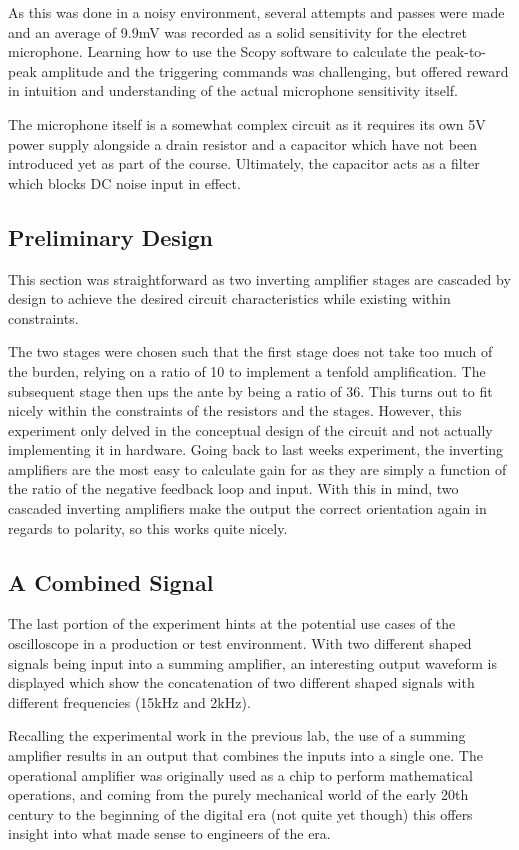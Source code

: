 \documentclass[12pt]{article}
\begin{document}
As this was done in a noisy environment, several attempts and passes were made
and an average of 9.9mV was recorded as a solid sensitivity for the electret
microphone. Learning how to use the Scopy software to calculate the peak-to-peak
amplitude and the triggering commands was challenging, but offered reward in
intuition and understanding of the actual microphone sensitivity itself.

The microphone itself is a somewhat complex circuit as it requires its own 5V
power supply alongside a drain resistor and a capacitor which have not been
introduced yet as part of the course. Ultimately, the capacitor acts as a filter
which blocks DC noise input in effect.
\subsection{Preliminary Design}
This section was straightforward as two inverting amplifier stages are
cascaded by design to achieve the desired circuit characteristics while existing
within constraints.

The two stages were chosen such that the first stage does not take too much of
the burden, relying on a ratio of 10 to implement a tenfold amplification. The
subsequent stage then ups the ante by being a ratio of 36. This turns out to fit
nicely within the constraints of the resistors and the stages. However, this
experiment only delved in the conceptual design of the circuit and not actually
implementing it in hardware. Going back to last weeks experiment, the inverting
amplifiers are the most easy to calculate gain for as they are simply a function
of the ratio of the negative feedback loop and input. With this in mind, two
cascaded inverting amplifiers make the output the correct orientation again in
regards to polarity, so this works quite nicely.

\subsection{A Combined Signal}
The last portion of the experiment hints at the potential use cases of the
oscilloscope in a production or test environment. With two different shaped
signals being input into a summing amplifier, an interesting output waveform is
displayed which show the concatenation of two different shaped signals with
different frequencies (15kHz and 2kHz).

Recalling the experimental work in the previous lab, the use of a summing
amplifier results in an output that combines the inputs into a single one. The
operational amplifier was originally used as a chip to perform mathematical
operations, and coming from the purely mechanical world of the early 20th
century to the beginning of the digital era (not quite yet though) this offers
insight into what made sense to engineers of the era.
\end{document}

